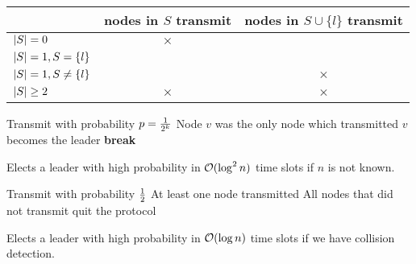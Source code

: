 \documentclass[11pt, oneside]{book}   						%
\begin{document}
\newpage
\begin{center}
\begin{tabular}{l | c | c}
	& nodes in $S$ transmit & nodes in $S\cup \{l\}$ transmit\\
	\hline
	$\left\vert S \right\vert=0$ & $\times$ & \checkmark \\
	$\left\vert S \right\vert=1, S=\{l\}$ & \checkmark & \checkmark\\
	$\left\vert S \right\vert=1, S\neq\{l\}$ & \checkmark & $\times$\\
	$\left\vert S \right\vert\ge 2$ & $\times$ & $\times$
\end{tabular}
\label{noisesilencetable}
\end{center}

\begin{algorithm}
\caption{}\label{uniformleader}
\begin{algorithmic}[1]
\ForEach[node $v$]
			\State Transmit with probability $p=\frac{1}{2^k}$
			\If Node $v$ was the only node which transmitted
				\State $v$ becomes the leader
				\State \textbf{break}
			\EndIf
		\EndFor
	\EndFor
\EndForEach
\end{algorithmic}
\end{algorithm}
\begin{mythm} Elects a leader with high probability in $\mathcal{O}(\log^2 n)$ time slots if $n$ is not known.\end{mythm}

\begin{algorithm}
\caption{}\label{uniformleadercd}
\begin{algorithmic}[1]
\ForEach[node $v$]
	\Repeat
		\State Transmit with probability $\frac{1}{2}$
		\If At least one node transmitted
			\State All nodes that did not transmit quit the protocol
		\EndIf
\EndForEach
\end{algorithmic}
\end{algorithm}
\begin{mythm} Elects a leader with high probability in $\mathcal{O}(\log n)$ time slots if we have collision detection.\end{mythm}
\end{document}
